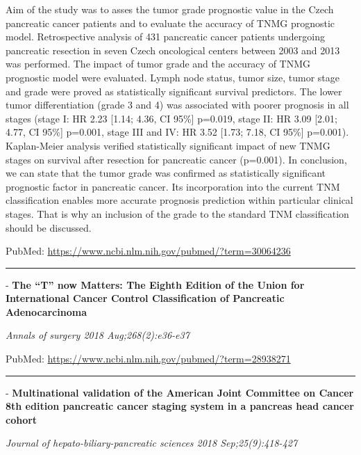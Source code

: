 \documentclass[]{article}
\begin{document}
Aim of the study was to asses the tumor grade prognostic value in the
Czech pancreatic cancer patients and to evaluate the accuracy of TNMG
prognostic model. Retrospective analysis of 431 pancreatic cancer
patients undergoing pancreatic resection in seven Czech oncological
centers between 2003 and 2013 was performed. The impact of tumor grade
and the accuracy of TNMG prognostic model were evaluated. Lymph node
status, tumor size, tumor stage and grade were proved as statistically
significant survival predictors. The lower tumor differentiation (grade
3 and 4) was associated with poorer prognosis in all stages (stage I: HR
2.23 {[}1.14; 4.36, CI 95\%{]} p=0.019, stage II: HR 3.09 {[}2.01; 4.77,
CI 95\%{]} p=0.001, stage III and IV: HR 3.52 {[}1.73; 7.18, CI 95\%{]}
p=0.001). Kaplan-Meier analysis verified statistically significant
impact of new TNMG stages on survival after resection for pancreatic
cancer (p=0.001). In conclusion, we can state that the tumor grade was
confirmed as statistically significant prognostic factor in pancreatic
cancer. Its incorporation into the current TNM classification enables
more accurate prognosis prediction within particular clinical stages.
That is why an inclusion of the grade to the standard TNM classification
should be discussed.

PubMed: \url{https://www.ncbi.nlm.nih.gov/pubmed/?term=30064236}

{}

{}

\begin{center}\rule{0.5\linewidth}{\linethickness}\end{center}

 - \textbf{The ``T'' now Matters: The Eighth Edition of the Union for
International Cancer Control Classification of Pancreatic
Adenocarcinoma}

\emph{Annals of surgery 2018 Aug;268(2):e36-e37}

PubMed: \url{https://www.ncbi.nlm.nih.gov/pubmed/?term=28938271}

{}

{}

\begin{center}\rule{0.5\linewidth}{\linethickness}\end{center}

 - \textbf{Multinational validation of the American Joint Committee on
Cancer 8th edition pancreatic cancer staging system in a pancreas head
cancer cohort}

\emph{Journal of hepato-biliary-pancreatic sciences 2018
Sep;25(9):418-427}
\end{document}
